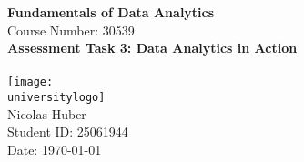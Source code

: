 \documentclass[10pt]{article}
\newcommand{\Course}{Fundamentals of Data Analytics} %
\newcommand{\CourseNo}{30539} %
\newcommand{\Title}{Assessment Task 3: Data Analytics in Action} %
\newcommand{\StudentName}{Nicolas Huber} %
\newcommand{\StudentId}{25061944} %
\begin{document}
\begin{titlepage}
    \centering
    \vspace*{1cm}
    \Huge
    \textbf{\Course}\\
    \vspace{0.5cm}
    \LARGE
    Course Number: \CourseNo\\
    \vspace{1.5cm}
    \textbf{\Title}\\
    \vspace{2cm}
    \textbf{\universitytext}\\
    \vfill
    \texttt{[image: \\universitylogo]}\\
    \vfill
    \Large
    \StudentName\\
    Student ID: \StudentId\\
    Date: \today
\end{titlepage}

\tableofcontents
\newpage


\newpage

\newpage

\newpage
\appendix

\newpage
\end{document}
